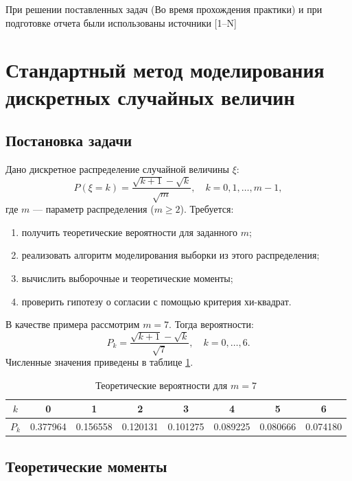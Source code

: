 \documentclass[bachelor, och, pract3]{SCWorks}
\begin{document}
При решении поставленных задач (Во время прохождения практики) и при подготовке отчета были использованы источники [1--N]

\section{Стандартный метод моделирования дискретных случайных величин}

\subsection{Постановка задачи}

Дано дискретное распределение случайной величины $\xi$:
\[
P(\xi = k) = \frac{\sqrt{k+1} - \sqrt{k}}{\sqrt{m}}, \quad k = 0, 1, \dots, m-1,
\]
где $m$ — параметр распределения ($m \ge 2$). Требуется:
\begin{enumerate}
    \item получить теоретические вероятности для заданного $m$;
    \item реализовать алгоритм моделирования выборки из этого распределения;
    \item вычислить выборочные и теоретические моменты;
    \item проверить гипотезу о согласии с помощью критерия хи-квадрат.
\end{enumerate}

В качестве примера рассмотрим $m = 7$. Тогда вероятности:
\[
P_k = \frac{\sqrt{k+1} - \sqrt{k}}{\sqrt{7}}, \quad k=0,\dots,6.
\]
Численные значения приведены в таблице \ref{tab:discr_probs}.

\begin{table}[h]
\centering
\begin{tabular}{|c|c|c|c|c|c|c|c|}
\hline
$k$ & 0 & 1 & 2 & 3 & 4 & 5 & 6 \\
\hline
$P_k$ & 0.377964 & 0.156558 & 0.120131 & 0.101275 & 0.089225 & 0.080666 & 0.074180 \\
\hline
\end{tabular}
\caption{Теоретические вероятности для $m=7$}
\label{tab:discr_probs}
\end{table}

\subsection{Теоретические моменты}
\end{document}
